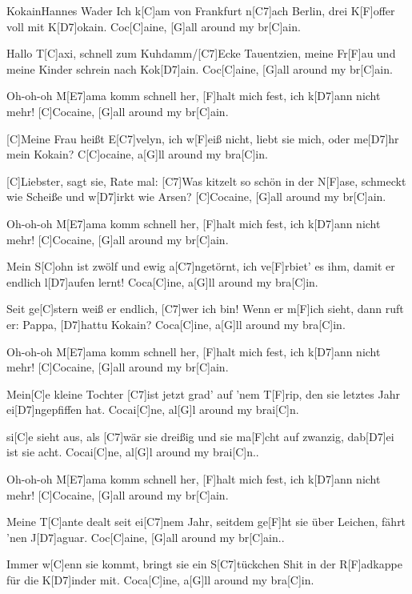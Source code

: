 \documentclass[../main.tex]{subfiles}
\begin{document}
\begin{song}{Kokain}{Hannes Wader}{}
Ich k[C]am von Frankfurt n[C7]ach Berlin, drei K[F]offer voll mit K[D7]okain.
Coc[C]aine, [G]all around my br[C]ain.

Hallo T[C]axi, schnell zum Kuhdamm/[C7]Ecke Tauentzien, meine Fr[F]au und meine Kinder schrein nach Kok[D7]ain.
Coc[C]aine, [G]all around my br[C]ain.

Oh-oh-oh M[E7]ama komm schnell her, [F]halt mich fest, ich k[D7]ann nicht mehr!
[C]Cocaine, [G]all around my br[C]ain.

[C]Meine Frau heißt E[C7]velyn, ich w[F]eiß nicht, liebt sie mich, oder me[D7]hr mein Kokain?
C[C]ocaine, a[G]ll around my bra[C]in.

[C]Liebster, sagt sie, Rate mal: [C7]Was kitzelt so schön in der N[F]ase, schmeckt wie Scheiße und w[D7]irkt wie Arsen?
[C]Cocaine, [G]all around my br[C]ain.

Oh-oh-oh M[E7]ama komm schnell her, [F]halt mich fest, ich k[D7]ann nicht mehr!
[C]Cocaine, [G]all around my br[C]ain.

Mein S[C]ohn ist zwölf und ewig a[C7]ngetörnt, ich ve[F]rbiet' es ihm, damit er endlich l[D7]aufen lernt!
Coca[C]ine, a[G]ll around my bra[C]in.

Seit ge[C]stern weiß er endlich, [C7]wer ich bin! Wenn er m[F]ich sieht, dann ruft er: Pappa, [D7]hattu Kokain?
Coca[C]ine, a[G]ll around my bra[C]in.

Oh-oh-oh M[E7]ama komm schnell her, [F]halt mich fest, ich k[D7]ann nicht mehr!
[C]Cocaine, [G]all around my br[C]ain.

Mein[C]e kleine Tochter [C7]ist jetzt grad' auf 'nem T[F]rip, den sie letztes Jahr ei[D7]ngepfiffen hat.
Cocai[C]ne, al[G]l around my brai[C]n.

si[C]e sieht aus, als [C7]wär sie dreißig und sie ma[F]cht auf zwanzig, dab[D7]ei ist sie acht.
Cocai[C]ne, al[G]l around my brai[C]n..

Oh-oh-oh M[E7]ama komm schnell her, [F]halt mich fest, ich k[D7]ann nicht mehr!
[C]Cocaine, [G]all around my br[C]ain.

Meine T[C]ante dealt seit ei[C7]nem Jahr, seitdem ge[F]ht sie über Leichen, fährt 'nen J[D7]aguar.
Coc[C]aine, [G]all around my br[C]ain..

Immer w[C]enn sie kommt, bringt sie ein S[C7]tückchen Shit in der R[F]adkappe für die K[D7]inder mit.
Coca[C]ine, a[G]ll around my bra[C]in.


\end{song}
\end{document}
